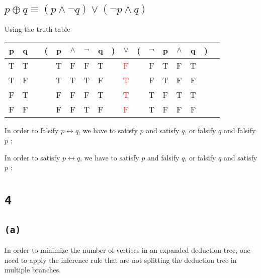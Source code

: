 \documentclass[a4paper,11pt]{report}
\begin{document}
\subsection*{\texttt{$ p \oplus q \equiv (p \wedge \neg q) \vee (\neg p \wedge
    q)$}}

Using the truth table

\begin{tabular}{@{ }c@{ }@{ }c | c@{ }@{}c@{}@{ }c@{ }@{ }c@{ }@{ }c@{ }@{ }c@{ }@{}c@{}@{ }c@{ }@{}c@{}@{ }c@{ }@{ }c@{ }@{ }c@{ }@{ }c@{ }@{}c@{}@{ }c}
p & q &  & ( & p & $\wedge$ & $\neg$ & q & ) & $\vee$ & ( & $\neg$ & p & $\wedge$ & q & ) & \\
\hline 
T & T &  &  & T & F & F & T &  & \textcolor{red}{F} &  & F & T & F & T &  & \\
T & F &  &  & T & T & T & F &  & \textcolor{red}{T} &  & F & T & F & F &  & \\
F & T &  &  & F & F & F & T &  & \textcolor{red}{T} &  & T & F & T & T &  & \\
F & F &  &  & F & F & T & F &  & \textcolor{red}{F} &  & T & F & F & F &  & \\
\end{tabular}

In order to falsify $p \leftrightarrow q$, we have to satisfy $p$
and satisfy $q$, or falsify $q$ and falsify $p$ :

\begin{prooftree}
\end{prooftree}

In order to satisfy $p \leftrightarrow q$, we have to satisfy $p$
and falsify $q$, or falsify $q$ and satisfy $p$ :

\begin{prooftree}
\end{prooftree}

\section*{\texttt{4}}

\subsection*{\texttt{(a)}}
In order to minimize the number of vertices in an expanded deduction tree, one
need to apply the inference rule that are not splitting the deduction tree in
multiple branches.
\end{document}
